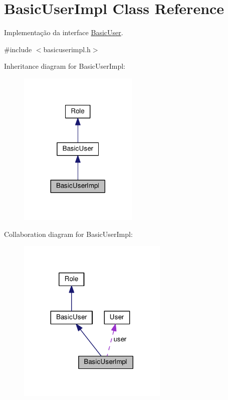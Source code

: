\hypertarget{classBasicUserImpl}{}\section{Basic\+User\+Impl Class Reference}
\label{classBasicUserImpl}


Implementação da interface \hyperlink{classBasicUser}{Basic\+User}.  




{\ttfamily \#include $<$basicuserimpl.\+h$>$}



Inheritance diagram for Basic\+User\+Impl\+:
\nopagebreak
\begin{figure}[H]
\begin{center}
\leavevmode
\includegraphics[width=161pt]{de/d1f/classBasicUserImpl__inherit__graph}
\end{center}
\end{figure}


Collaboration diagram for Basic\+User\+Impl\+:
\nopagebreak
\begin{figure}[H]
\begin{center}
\leavevmode
\includegraphics[width=203pt]{d7/dcb/classBasicUserImpl__coll__graph}
\end{center}
\end{figure}
